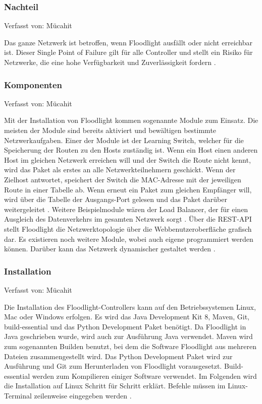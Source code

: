 \documentclass[fontsize=12pt,paper=a4,open=any,parskip=half,
  twoside=false,toc=listof,toc=bibliography,fleqn,leqno,
  captions=nooneline,captions=tableabove,british]{scrbook}
\begin{document}
\subsubsection{Nachteil}
{\tiny Verfasst von: Mücahit\par}
Das ganze Netzwerk ist betroffen, wenn Floodlight ausfällt oder nicht erreichbar ist. Dieser Single Point of Failure gilt für alle Controller und stellt ein Risiko für Netzwerke, die eine hohe Verfügbarkeit und Zuverlässigkeit fordern \cite{failure}.

\subsubsection{Komponenten}
{\tiny Verfasst von: Mücahit\par}
Mit der Installation von Floodlight kommen sogenannte Module zum Einsatz. Die meisten der Module sind bereits aktiviert und bewältigen bestimmte Netzwerkaufgaben. Einer der Module ist der Learning Switch, welcher für die Speicherung der Routen zu den Hosts zuständig ist. Wenn ein Host einen anderen Host im gleichen Netzwerk erreichen will und der Switch die Route nicht kennt, wird das Paket als erstes an alle Netzwerkteilnehmern geschickt. Wenn der Zielhost antwortet, speichert der Switch die MAC-Adresse mit der jeweiligen Route in einer Tabelle ab. Wenn erneut ein Paket zum gleichen Empfänger will, wird über die Tabelle der Ausgangs-Port gelesen und das Paket darüber weitergeleitet \cite{broadcast}. Weitere Beispielmodule wären der Load Balancer, der für einen Ausgleich des Datenverkehrs im gesamten Netzwerk sorgt \cite{loadbalance}. Über die REST-API stellt Floodlight die Netzwerktopologie über die Webbenutzeroberfläche grafisch dar. Es existieren noch weitere Module, wobei auch eigene programmiert werden können. Darüber kann das Netzwerk dynamischer gestaltet werden \cite{restapi}.

\subsubsection{Installation}
{\tiny Verfasst von: Mücahit\par}
Die Installation des Floodlight-Controllers kann auf den Betriebssystemen Linux, Mac oder Windows erfolgen. Es wird das Java Development Kit 8, Maven, Git, build-essential und das Python Development Paket benötigt. Da Floodlight in Java geschrieben wurde, wird auch zur Ausführung Java verwendet. Maven wird zum sogenannten Builden benutzt, bei dem die Software Floodlight aus mehreren Dateien zusammengestellt wird. Das Python Development Paket wird zur Ausführung und Git zum Herunterladen von Floodlight vorausgesetzt. Build-essential werden zum Kompilieren einiger Software verwendet. Im Folgenden wird die Installation auf Linux Schritt für Schritt erklärt. Befehle müssen im Linux-Terminal zeilenweise eingegeben werden \cite{install}.
\end{document}
